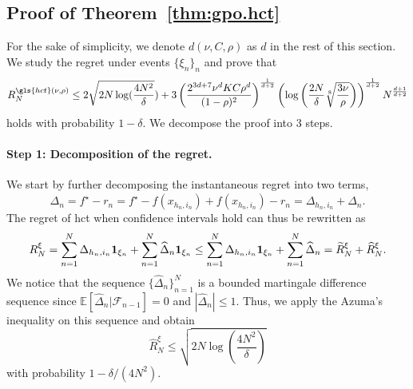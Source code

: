 \subsection{Proof of Theorem~\ref{thm:gpo.hct}}\label{proof:thm}
\restathmhct*
\noindent
For the sake of simplicity, we denote $d(\nu,C,\rho)$ as $d$ in the rest of this section. We study the regret under events $\{\xi_n\}_n$ and prove that
\[
R_N^{\gls{hct}(\nu,\rho)} \leq 2\sqrt{2N\log(\frac{4N^2}{\delta}}) + 3\left(\frac{2^{3d+7}\nu^d KC\rho^d}{(1-\rho)^{2}}\right)^{\frac{1}{d+2}}\left(\log\left(\frac{2N}{\delta}\sqrt[8]{\frac{3\nu}{\rho}}\right)\right)^{\frac{1}{d+2}}N^{\frac{d+1}{d+2}}
\]
holds with probability $1-\delta$. We decompose the proof into 3 steps.

\paragraph{Step 1: Decomposition of the regret.}
We start by further decomposing the instantaneous regret into two terms,
\[
\Delta_n = f^\star - r_n = f^\star - f(x_{h_n,i_n}) + f(x_{h_n,i_n}) - r_n = \Delta_{h_n,i_n} + \hat{\Delta}_n.
\]
The regret of \gls{hct} when confidence intervals hold can thus be rewritten as
\begin{equation} \label{eq2}
R_N^{\xi} = \sum_{n=1}^N \Delta_{h_n,i_n} {\bf 1}_{\xi_n} + \sum_{n=1}^N \widehat{\Delta}_n {\bf 1}_{\xi_n} \leq \sum_{n=1}^N \Delta_{h_n,i_n} {\bf 1}_{\xi_n} + \sum_{n=1}^N \widehat{\Delta}_n = \widetilde{R}_N^{\xi} + \widehat{R}_N^{\xi}.
\end{equation}
We notice that the sequence $\{\hat{\Delta}_n\}_{n=1}^N$ is a bounded martingale difference sequence since $\mathbb{E}\left[\hat{\Delta}_n|\mathcal{F}_{n-1}\right]=0$ and $|\hat{\Delta}_n|\leq 1$. Thus, we apply the Azuma's inequality on this sequence and obtain
\begin{equation} \label{eq3}
\hat{R}_N^{\xi} \leq \sqrt{2N\log\left(\frac{4N^2}{\delta}\right)}
\end{equation}
with probability $1-\delta/(4N^2)$.


